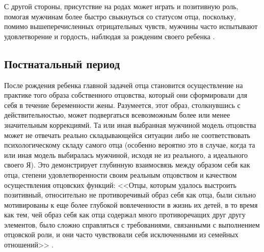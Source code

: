 \documentclass{../../common/thesisbyxetex}
\begin{document}
С другой стороны, присутствие на родах может играть и позитивную роль, помогая мужчинам более
быстро свыкнуться со статусом отца, поскольку, помимо вышеперечисленных отрицательных чувств,
мужчины часто испытывают удовлетворение и гордость, наблюдая за рожденим своего ребенка
\cite[314]{flit}.



\subsection{Постнатальный период}





После рождения ребенка главной задачей отца становится осуществление на практике того образа
собственного отцовства, который они сформировали для себя в течение беременности жены. Разумеется,
этот образ, столкнувшись с действительностью, может подвергаться всевозможным более или менее
значительным коррекциямй. Та или иная выбранная мужчиной модель отцовства может не отвечать реально
складывающейся ситуации либо не соответствовать психологическому складу самого отца (особенно
вероятно это в случае, когда та или иная модель выбиралась мужчиной, исходя не из реального, а
идеального своего Я). Это демонстрирует глубинную взаимосвязь между образом себя как отца, степени
удовлетворенности своим реальным отцовством и качеством осуществления
отцовских функций: <<Отцы, которым удалось выстроить позитивный, относительно не противоречивый
образ себя как отца, были сильно мотивированы к еще более глубокой вовлеченности в жизнь их
детей, в то время как тем, чей образ себя как отца содержал много противоречащих друг другу
элементов, было сложно справляться с требованиями, связанными с выполнением отцовской роли, и
они часто чувствовали себя исключенными из семейных отношений>> \cite[314]{flit}.
\end{document}
